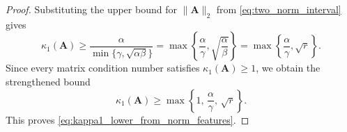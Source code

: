 \documentclass[10pt,a4paper]{amsart}
\begin{document}
\begin{proof}
Substituting the upper bound for $\|\mathbf{A}\|_2$ from \eqref{eq:two_norm_interval} gives
\begin{equation*}
\kappa_1(\mathbf{A})
\ge
\frac{\alpha}{\min\{\gamma,\sqrt{\alpha\beta}\}}
=
\max\!\left\{\frac{\alpha}{\gamma},\sqrt{\frac{\alpha}{\beta}}\right\}
=
\max\!\left\{\frac{\alpha}{\gamma},\sqrt{r}\right\}.
\end{equation*}
Since every matrix condition number satisfies $\kappa_1(\mathbf A)\ge 1$, we obtain the strengthened bound
\begin{equation*}
\kappa_1(\mathbf A)
\ge
\max\!\left\{
1,\,
\frac{\alpha}{\gamma},\,
\sqrt r
\right\}.
\end{equation*}
This proves \eqref{eq:kappa1_lower_from_norm_features}.
\end{proof}
\end{document}
